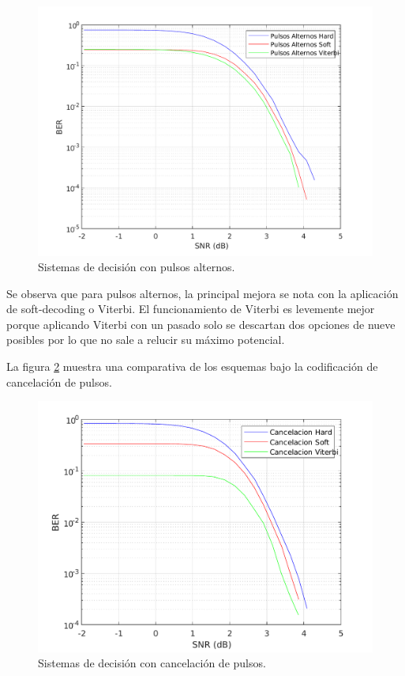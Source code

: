 \begin{figure}[ht]
    \centering
    \includegraphics[scale=0.6]{./figuras/alternos.pdf}
    \caption{\small{Sistemas de decisión con pulsos alternos.}}
    \label{alternos}%
\end{figure}

Se observa que para pulsos alternos, la principal mejora se nota con la aplicación 
de soft-decoding o Viterbi. El funcionamiento de Viterbi es levemente mejor porque 
aplicando Viterbi con un pasado solo se descartan dos opciones de nueve posibles por lo 
que no sale a relucir su máximo potencial. 

La figura \ref{cancelacion} muestra una comparativa de los esquemas bajo 
la codificación de cancelación de pulsos.

\begin{figure}[ht]
    \centering
    \includegraphics[scale=0.6]{./figuras/cancelacion.pdf}
    \caption{\small{Sistemas de decisión con cancelación de pulsos.}}
    \label{cancelacion}%
\end{figure}

